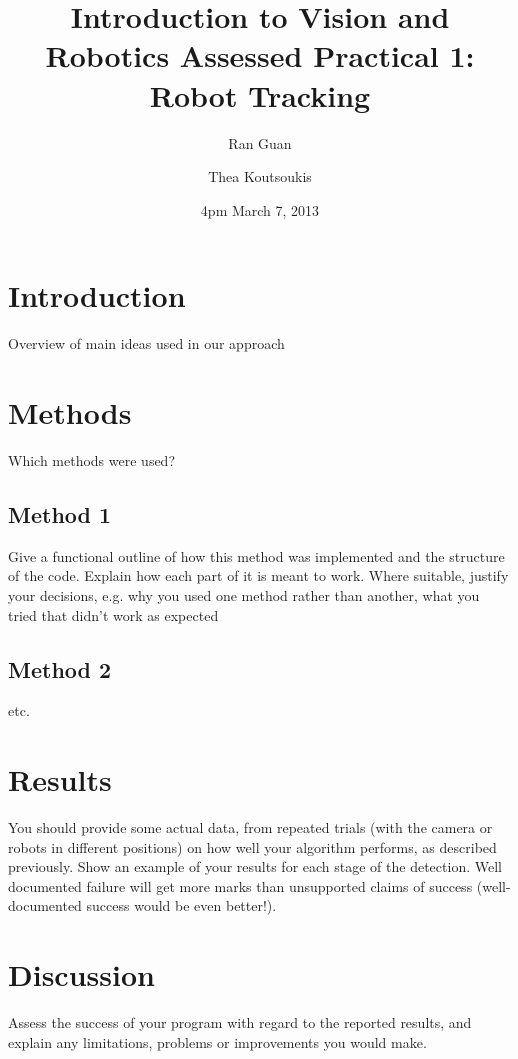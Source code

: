 \documentclass{report}
\title{\bf Introduction to Vision and Robotics Assessed Practical 1: Robot Tracking}  %
\author{
	Ran Guan\\
	\and
	Thea Koutsoukis\\            
}
\date{4pm March 7, 2013}
\begin{document}
\maketitle                              %
\setcounter{page}{2}                    %
\tableofcontents         
\renewcommand{\chaptername}{}           %

\chapter{Introduction}                	%
Overview of main ideas used in our approach
 
\chapter{Methods}                		
Which methods were used? 
 
\section{Method 1}                  	%
Give a functional outline of how this method was implemented and the structure of the code. Explain how each part of it is meant to work. Where suitable, justify your
decisions, e.g. why you used one method rather than another, what you tried
that didn't work as expected

\section{Method 2}                  
etc.

\chapter{Results}                
You should provide some actual data, from repeated trials (with the
camera or robots in different positions) on how well your algorithm performs,
as described previously. Show an example of your results for each stage of
the detection. Well documented failure will get more marks than unsupported
claims of success (well-documented success would be even better!).


\chapter{Discussion}                
Assess the success of your program with regard to the reported results, and explain any limitations, problems or improvements you would make.
\end{document}
